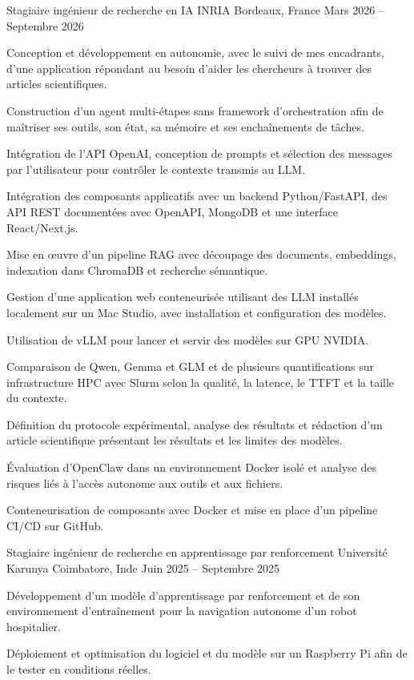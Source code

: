 
\begin{cventries}
  \cventry
    {Stagiaire ingénieur de recherche en IA}
    {INRIA}
    {Bordeaux, France}
    {Mars 2026 -- Septembre 2026}
    {
      \begin{cvitems}
        \item {Conception et développement en autonomie, avec le suivi de mes encadrants, d’une application répondant au besoin d’aider les chercheurs à trouver des articles scientifiques.}
        \item {Construction d’un agent multi-étapes sans framework d’orchestration afin de maîtriser ses outils, son état, sa mémoire et ses enchaînements de tâches.}
        \item {Intégration de l’API OpenAI, conception de prompts et sélection des messages par l’utilisateur pour contrôler le contexte transmis au LLM.}
        \item {Intégration des composants applicatifs avec un backend Python/FastAPI, des API REST documentées avec OpenAPI, MongoDB et une interface React/Next.js.}
        \item {Mise en œuvre d’un pipeline RAG avec découpage des documents, embeddings, indexation dans ChromaDB et recherche sémantique.}
        \item {Gestion d’une application web conteneurisée utilisant des LLM installés localement sur un Mac Studio, avec installation et configuration des modèles.}
        \item {Utilisation de vLLM pour lancer et servir des modèles sur GPU NVIDIA.}
        \item {Comparaison de Qwen, Gemma et GLM et de plusieurs quantifications sur infrastructure HPC avec Slurm selon la qualité, la latence, le TTFT et la taille du contexte.}
        \item {Définition du protocole expérimental, analyse des résultats et rédaction d’un article scientifique présentant les résultats et les limites des modèles.}
        \item {Évaluation d’OpenClaw dans un environnement Docker isolé et analyse des risques liés à l’accès autonome aux outils et aux fichiers.}
        \item {Conteneurisation de composants avec Docker et mise en place d’un pipeline CI/CD sur GitHub.}
      \end{cvitems}
    }

  \cventry
    {Stagiaire ingénieur de recherche en apprentissage par renforcement}
    {Université Karunya}
    {Coimbatore, Inde}
    {Juin 2025 -- Septembre 2025}
    {
      \begin{cvitems}
        \item {Développement d’un modèle d’apprentissage par renforcement et de son environnement d’entraînement pour la navigation autonome d’un robot hospitalier.}
        \item {Déploiement et optimisation du logiciel et du modèle sur un Raspberry Pi afin de le tester en conditions réelles.}
      \end{cvitems}
    }
\end{cventries}
